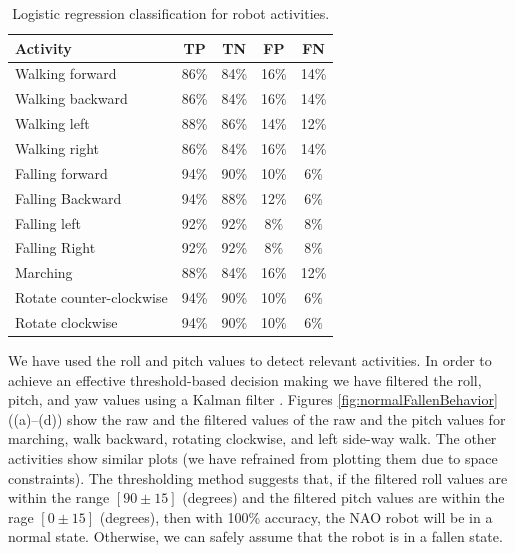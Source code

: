 \documentclass[letterpaper]{article}
\begin{document}
\begin{sloppy}
\begin{table}[!ht]
\caption{Logistic regression classification for robot activities.}
	\label{tab:robot-logistic-class}
	\centering
		\begin{tabular} {| l | c | c | c| c|}
		\hline
			{\bf Activity} & {\bf  TP}  &	{\bf TN}  &	{\bf FP} &	{\bf FN} \\ 
\hline
			Walking forward	& 86\%	& 84\%	& 16\%	& 14\% \\ \hline
			Walking backward	& 86\%	& 84\%	& 16\%	& 14\% \\ \hline
			Walking left 	& 88\%	& 86\%	& 14\%	& 12\% \\ \hline
			Walking right 	& 86\%	& 84\%	& 16\%	& 14\% \\ \hline
			Falling forward	& 94\%	& 90\%	& 10\%	& 6\%	 \\ \hline
			Falling Backward	& 94\%	& 88\%	& 12\%	& 6\%	 \\ \hline
			Falling left	& 92\%	& 92\%	& 8\%	& 8\%	 \\ \hline
			Falling Right	& 92\%	& 92\%	& 8\%	& 8\%	 \\ \hline
			Marching	& 88\%	& 84\%	& 16\%	& 12\%	 \\ \hline
			Rotate counter-clockwise	& 94\%	& 90\%	& 10\%	& 6\%	 \\ \hline
			Rotate clockwise	& 94\%	& 90\%	& 10\%	& 6\%	 \\ \hline
		\end{tabular}
\end{table}

We have used the roll and pitch values to detect relevant activities. In order to achieve 
an effective threshold-based decision making we have filtered the roll, pitch, and
yaw values using a Kalman filter \cite{Welch:1995:IKF:897831}. Figures 
\ref{fig:normalFallenBehavior} ((a)--(d)) show
the raw and the filtered values of the raw and the pitch values for marching, walk backward,
rotating clockwise, and left side-way walk. The other activities show similar plots (we have 
refrained from plotting them due to space constraints). The thresholding method
suggests that, if the filtered roll values are within the range $[90\pm15]$ (degrees) and the
filtered pitch values are within the rage $[0\pm15]$ (degrees), then with 100\% accuracy, the NAO 
 robot will be in a normal state. Otherwise, we can safely assume that the robot is in 
a fallen state.   


\end{sloppy}
\end{document}
